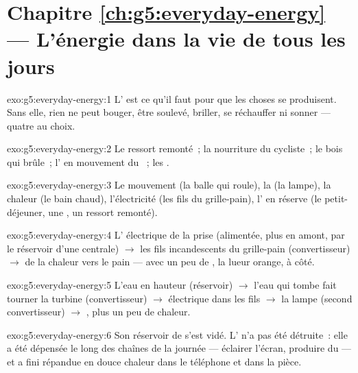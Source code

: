 \section*{Chapitre \ref{ch:g5:everyday-energy} --- L'énergie dans la vie de tous les jours}

\begin{solution}{exo:g5:everyday-energy:1}
L' est ce qu'il faut pour que les choses se produisent. Sans
elle, rien ne peut bouger, être soulevé, briller, se réchauffer ni
sonner --- quatre au choix.
\end{solution}

\begin{solution}{exo:g5:everyday-energy:2}
Le ressort remonté~; la nourriture du cycliste~; le bois qui brûle~;
l' en mouvement du ~; les .
\end{solution}

\begin{solution}{exo:g5:everyday-energy:3}
Le mouvement (la balle qui roule), la  (la lampe), la chaleur
(le bain chaud), l'électricité (les fils du grille-pain), l'
en réserve (le petit-déjeuner, une , un ressort remonté).
\end{solution}

\begin{solution}{exo:g5:everyday-energy:4}
L' électrique de la prise (alimentée, plus en amont, par le
réservoir d'une centrale) $\to$ les fils incandescents du grille-pain
(convertisseur) $\to$ de la chaleur vers le pain --- avec un peu de
, la lueur orange, à côté.
\end{solution}

\begin{solution}{exo:g5:everyday-energy:5}
L'eau en hauteur (réservoir) $\to$ l'eau qui tombe fait tourner la
turbine (convertisseur) $\to$  électrique dans les fils $\to$
la lampe (second convertisseur) $\to$ , plus un peu de
chaleur.
\end{solution}

\begin{solution}{exo:g5:everyday-energy:6}
Son réservoir de  s'est vidé. L' n'a pas été détruite~:
elle a été dépensée le long des chaînes de la journée --- éclairer
l'écran, produire du  --- et a fini répandue en douce chaleur dans
le téléphone et dans la pièce.
\end{solution}

